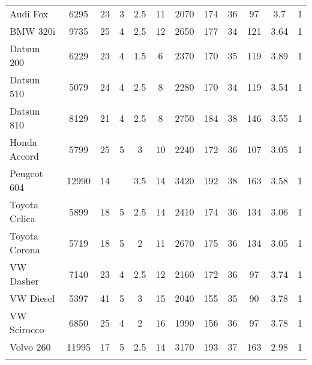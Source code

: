 \documentclass{article}
\begin{document}
\begin{table}[tbp]
{\begin{tabularx}{\linewidth}{lCCCCCCCCCCC}
Audi Fox&6295&23&3&2.5&11&2070&174&36&97&3.7&1 \tabularnewline \addlinespace[0.1cm]
BMW 320i&9735&25&4&2.5&12&2650&177&34&121&3.64&1 \tabularnewline \addlinespace[0.1cm]
Datsun 200&6229&23&4&1.5&6&2370&170&35&119&3.89&1 \tabularnewline \addlinespace[0.1cm]
Datsun 510&5079&24&4&2.5&8&2280&170&34&119&3.54&1 \tabularnewline \addlinespace[0.1cm]
Datsun 810&8129&21&4&2.5&8&2750&184&38&146&3.55&1 \tabularnewline \addlinespace[0.1cm]
Honda Accord&5799&25&5&3&10&2240&172&36&107&3.05&1 \tabularnewline \addlinespace[0.1cm]
Peugeot 604&12990&14&&3.5&14&3420&192&38&163&3.58&1 \tabularnewline \addlinespace[0.1cm]
Toyota Celica&5899&18&5&2.5&14&2410&174&36&134&3.06&1 \tabularnewline \addlinespace[0.1cm]
Toyota Corona&5719&18&5&2&11&2670&175&36&134&3.05&1 \tabularnewline \addlinespace[0.1cm]
VW Dasher&7140&23&4&2.5&12&2160&172&36&97&3.74&1 \tabularnewline \addlinespace[0.1cm]
VW Diesel&5397&41&5&3&15&2040&155&35&90&3.78&1 \tabularnewline \addlinespace[0.1cm]
VW Scirocco&6850&25&4&2&16&1990&156&36&97&3.78&1 \tabularnewline \addlinespace[0.1cm]
Volvo 260&11995&17&5&2.5&14&3170&193&37&163&2.98&1 \tabularnewline \addlinespace[0.1cm]
\bottomrule 

\end{tabularx}
}
\end{table}
\end{document}
